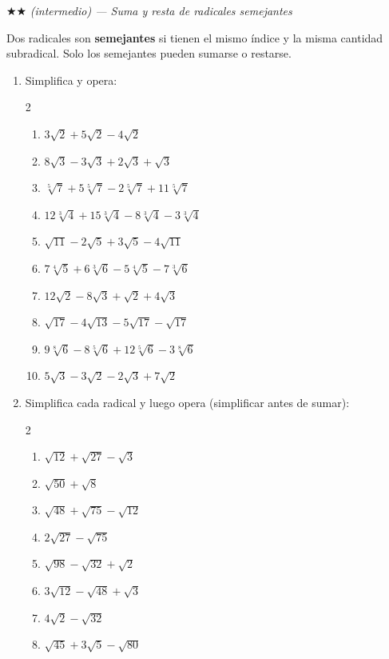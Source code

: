 \documentclass[11pt, letterpaper]{article}
\begin{document}
$\bigstar\bigstar$ \textit{(intermedio) — Suma y resta de radicales semejantes}

Dos radicales son \textbf{semejantes} si tienen el mismo índice y la misma cantidad subradical. Solo los semejantes pueden sumarse o restarse.

\begin{enumerate}[label=\textbf{\arabic*.}, leftmargin=*, resume]
  \item Simplifica y opera:
  \begin{multicols}{2}
  \begin{enumerate}[label=\alph*)]
    \item $3\sqrt{2}+5\sqrt{2}-4\sqrt{2}$
    \item $8\sqrt{3}-3\sqrt{3}+2\sqrt{3}+\sqrt{3}$
    \item $\sqrt[5]{7}+5\sqrt[5]{7}-2\sqrt[5]{7}+11\sqrt[5]{7}$
    \item $12\sqrt[3]{4}+15\sqrt[3]{4}-8\sqrt[3]{4}-3\sqrt[3]{4}$
    \item $\sqrt{11}-2\sqrt{5}+3\sqrt{5}-4\sqrt{11}$
    \item $7\sqrt[4]{5}+6\sqrt[3]{6}-5\sqrt[4]{5}-7\sqrt[3]{6}$
    \item $12\sqrt{2}-8\sqrt{3}+\sqrt{2}+4\sqrt{3}$
    \item $\sqrt{17}-4\sqrt{13}-5\sqrt{17}-\sqrt{17}$
    \item $9\sqrt[8]{6}-8\sqrt[5]{6}+12\sqrt[5]{6}-3\sqrt[8]{6}$
    \item $5\sqrt{3}-3\sqrt{2}-2\sqrt{3}+7\sqrt{2}$
  \end{enumerate}
  \end{multicols}

  \item Simplifica cada radical y luego opera (simplificar antes de sumar):
  \begin{multicols}{2}
  \begin{enumerate}[label=\alph*)]
    \item $\sqrt{12}+\sqrt{27}-\sqrt{3}$
    \item $\sqrt{50}+\sqrt{8}$
    \item $\sqrt{48}+\sqrt{75}-\sqrt{12}$
    \item $2\sqrt{27}-\sqrt{75}$
    \item $\sqrt{98}-\sqrt{32}+\sqrt{2}$
    \item $3\sqrt{12}-\sqrt{48}+\sqrt{3}$
    \item $4\sqrt{2}-\sqrt{32}$
    \item $\sqrt{45}+3\sqrt{5}-\sqrt{80}$
  \end{enumerate}
  \end{multicols}
\end{enumerate}
\end{document}
